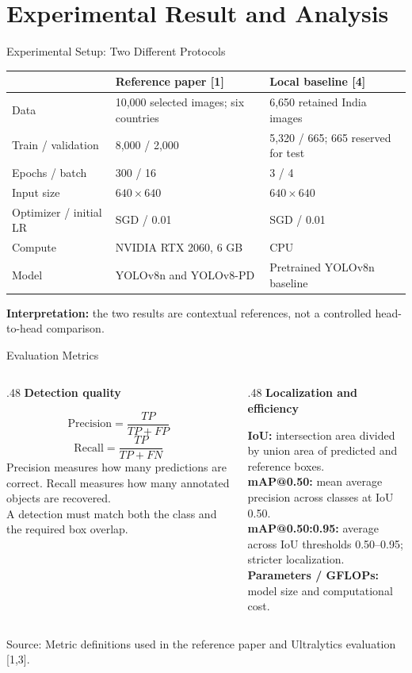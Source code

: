 \documentclass[aspectratio=169,11pt]{beamer}
\newcommand{\source}[1]{\par\vfill{\fontsize{7}{9}\selectfont\color{muted}Source: #1\par}}
\newcommand{\lead}[1]{{\large\bfseries\color{teal}#1}\par\medskip}
\begin{document}
\section{Experimental Result and Analysis}
\begin{frame}{Experimental Setup: Two Different Protocols}
\small\renewcommand{\arraystretch}{1.4}
\begin{tabular}{p{3.2cm}p{4.7cm}p{4.8cm}}
\toprule &\textbf{Reference paper [1]}&\textbf{Local baseline [4]}\\\midrule
Data & 10,000 selected images; six countries & 6,650 retained India images\\
Train / validation & 8,000 / 2,000 & 5,320 / 665; 665 reserved for test\\
Epochs / batch & 300 / 16 & 3 / 4\\
Input size & $640\times640$ & $640\times640$\\
Optimizer / initial LR & SGD / 0.01 & SGD / 0.01\\
Compute & NVIDIA RTX 2060, 6 GB & CPU\\
Model & YOLOv8n and YOLOv8-PD & Pretrained YOLOv8n baseline\\\bottomrule
\end{tabular}
\medskip
\textbf{Interpretation:} the two results are contextual references, not a controlled head-to-head comparison.
\end{frame}

\begin{frame}{Evaluation Metrics}
\begin{columns}[T]
\begin{column}{.48\textwidth}
\lead{Detection quality}
\[\mathrm{Precision}=\frac{TP}{TP+FP}\] \[
\mathrm{Recall}=\frac{TP}{TP+FN}\]
\small
Precision measures how many predictions are correct. Recall measures how many annotated objects are recovered.\\[3mm]
A detection must match both the class and the required box overlap.
\end{column}
\begin{column}{.48\textwidth}
\lead{Localization and efficiency}
\small
\textbf{IoU:} intersection area divided by union area of predicted and reference boxes.\\[3mm]
\textbf{mAP@0.50:} mean average precision across classes at IoU 0.50.\\[3mm]
\textbf{mAP@0.50:0.95:} average across IoU thresholds 0.50--0.95; stricter localization.\\[3mm]
\textbf{Parameters / GFLOPs:} model size and computational cost.
\end{column}
\end{columns}
\source{Metric definitions used in the reference paper and Ultralytics evaluation [1,3].}
\end{frame}
\end{document}
